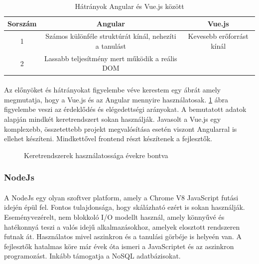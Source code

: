 \documentclass{article}
\begin{document}
	\begin{table}
		\begin{center}
			\caption{Hátrányok Angular és Vue.js között \cite{vuevsang}}
			\label{tab:table2}
			\begin{tabular}{c|c|c} 
				\textbf{Sorszám} & \textbf{Angular} & \textbf{Vue.js}\\
				\hline
				1 & Számos különféle struktúrát kínál, nehezíti a tanulást & Kevesebb erőforrást kínál\\
				\hline
				2 & Lassabb teljesítmény mert működik a reális DOM &  \\
			\end{tabular}
		\end{center}
	\end{table}
	\paragraph{}
	Az előnyöket és hátrányokat figyelembe véve kerestem egy ábrát amely megmutatja, hogy a Vue.js és az Angular mennyire használatosak. \ref{fig:vueang} ábra figyelembe veszi az érdeklődés és elégedettségi arányokat. A bemutatott adatok alapján mindkét keretrendszert sokan használják. Javasolt a Vue.js egy komplexebb, összetettebb projekt megvalósítása esetén viszont Angularral is ellehet készíteni. Mindkettővel frontend részt készítenek a fejlesztők.
	
	\begin{figure}
		\centering
		\caption{Keretrendszerek használatossága évekre bontva \cite{vueanginterest}}
		\label{fig:vueang}
	\end{figure}
	
	\subsubsection{NodeJs}
	\paragraph{} 
	A NodeJs egy olyan szoftver platform, amely a Chrome V8 JavaScript futási idején épül fel. Fontos tulajdonsága, hogy skálázható ezért is sokan használják. Eseményvezérelt, nem blokkoló I/O modellt használ, amely könnyűvé és hatékonnyá teszi a valós idejű alkalmazásokhoz, amelyek elosztott rendszeren futnak át. Használatos mivel aszinkron és a tanulási görbéje is helyeén van. A fejlesztők hatalmas köre már évek óta ismeri a JavaScriptet és az aszinkron programozást. Inkább támogatja a NoSQL adatbázisokat.\cite{js2016node}
	
\end{document}

